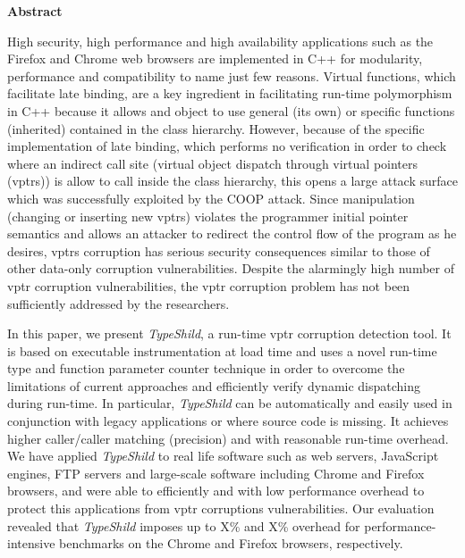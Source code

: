 

\clearemptydoublepage
{}
{}	

\vspace*{2cm}
\begin{center}
{\Large \bf Abstract}
\end{center}
\vspace{1cm}

High security, high performance and high availability 
applications such as the Firefox and Chrome web browsers 
are implemented in C++ for modularity, performance and 
compatibility to name just few reasons.
Virtual functions, which facilitate late binding,
are a key ingredient in facilitating run-time polymorphism
in C++ because it allows and object to use general (its own) 
or specific functions (inherited) contained in the class hierarchy.
However, because of the specific implementation of late binding,
which performs no verification in order to check where an indirect call site 
(virtual object dispatch through virtual pointers (vptrs)) is allow to
call inside the class hierarchy, this opens a large attack surface which
was successfully exploited by the COOP attack.
Since manipulation (changing or inserting new vptrs) violates the 
programmer initial pointer semantics and allows an attacker to
redirect the control flow of the program as he desires, vptrs corruption
has serious security consequences similar to those of other 
data-only corruption vulnerabilities.
Despite the alarmingly high number of vptr corruption
vulnerabilities, the vptr corruption problem has not
been sufficiently addressed by the researchers.

In this paper, we present \textit{TypeShild}, a run-time vptr corruption
detection tool. It is based on executable instrumentation at load time
and uses a novel run-time type and function parameter counter technique
in order to overcome the limitations of current approaches and efficiently
verify dynamic dispatching during run-time.
In particular, \textit{TypeShild} can be automatically and easily used
in conjunction with legacy applications or where source code is missing.
It achieves higher caller/caller matching (precision) and with reasonable
run-time overhead.
We have applied \textit{TypeShild} to real life software such as
web servers, JavaScript engines, FTP servers and large-scale software
including Chrome and Firefox browsers, and were able to efficiently
and with low performance overhead to protect this applications from 
vptr corruptions vulnerabilities.
Our evaluation revealed that \textit{TypeShild} imposes up
to X\% and X\% overhead for performance-intensive
benchmarks on the Chrome and Firefox browsers, respectively.